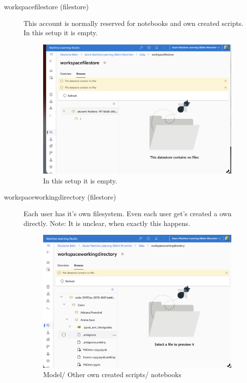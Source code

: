 \begin{description}
	\item[workspacefilestore (filestore)] This account is normally reserved for notebooks and own created scripts. In this setup it is empty.
	\begin{figure}[H]
		\centering
		\includegraphics[scale = 0.1]{attachment/chapter_10/Scc037}
		\caption{In this setup it is empty.}
	\end{figure}
	\item[workspaceworkingdirectory (filestore)] Each user has it's own filesystem. Even each user get's created a own directly. Note: It is unclear, when exactly this happens. 
	\begin{figure}[H]
		\centering
		\includegraphics[scale = 0.1]{attachment/chapter_10/Scc038}
		\caption{Model/ Other own created scripts/ notebooks}

\end{figure}
\end{description}
